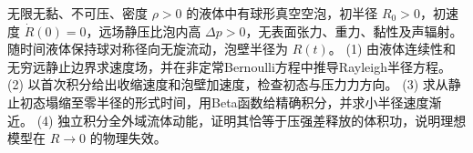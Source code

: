 无限无黏、不可压、密度 \(\rho>0\) 的液体中有球形真空空泡，初半径 \(R_0>0\)，初速度 \(\dot R(0)=0\)，远场静压比泡内高 \(\Delta p>0\)，无表面张力、重力、黏性及声辐射。随时间液体保持球对称径向无旋流动，泡壁半径为 \(R(t)\)。
(1) 由液体连续性和无穷远静止边界求速度场，并在非定常Bernoulli方程中推导Rayleigh半径方程。
(2) 以首次积分给出收缩速度和泡壁加速度，检查初态与压力力方向。
(3) 求从静止初态塌缩至零半径的形式时间，用Beta函数给精确积分，并求小半径速度渐近。
(4) 独立积分全外域流体动能，证明其恰等于压强差释放的体积功，说明理想模型在 \(R\to0\) 的物理失效。
